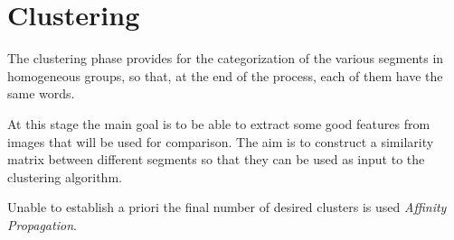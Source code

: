 \section{Clustering}

The clustering phase provides for the categorization of the various segments in homogeneous groups, so that, at the end of the process, each of them have the same words.

At this stage the main goal is to be able to extract some good features from images that will be used for comparison. The aim is to construct a similarity matrix between different segments so that they can be used as input to the clustering algorithm.

Unable to establish a priori the final number of desired clusters is used \emph{Affinity Propagation}.
